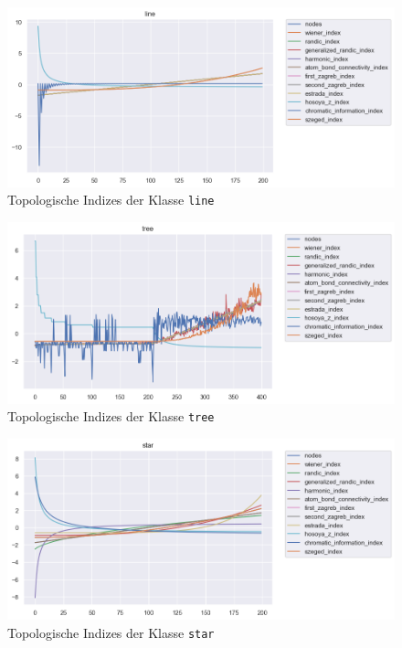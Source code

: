 \begin{figure}[H]
    \centering
    \includegraphics[width=\textwidth]{images/30_results/line-ti-comparison.png}
    \caption{Topologische Indizes der Klasse \texttt{line}}
    \label{fig:big-ti-comparison-line}
\end{figure}
\begin{figure}[H]
    \centering
    \includegraphics[width=\textwidth]{images/30_results/tree-ti-comparison.png}
    \caption{Topologische Indizes der Klasse \texttt{tree}}
    \label{fig:big-ti-comparison-tree}
\end{figure}

\begin{figure}[H]
    \centering
    \includegraphics[width=\textwidth]{images/30_results/star-ti-comparison.png}
    \caption{Topologische Indizes der Klasse \texttt{star}}
    \label{fig:big-ti-comparison-star}
\end{figure}

